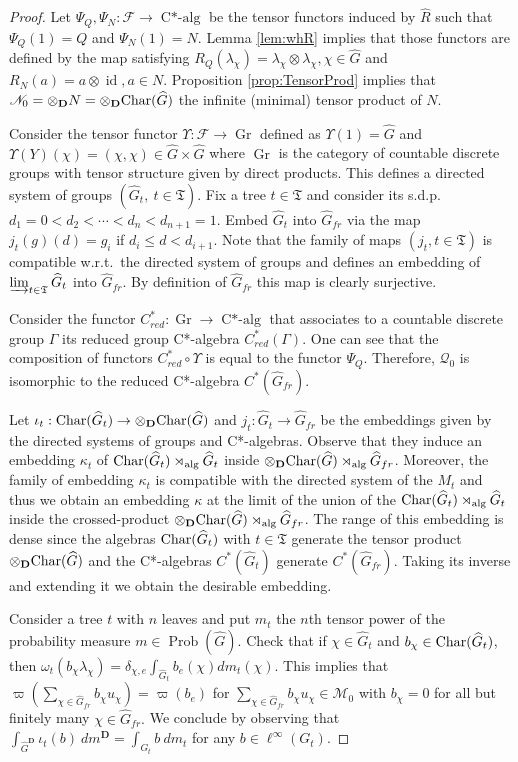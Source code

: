 \documentclass[a4paper,12pt]{amsart}
\numberwithin{equation}{section}
\theoremstyle{definition}
\DeclareMathOperator{\Gr}{Gr}
\DeclareMathOperator{\id}{id}
\DeclareMathOperator{\alg}{alg}
\DeclareMathOperator{\Calg}{C*-alg}
\newcommand{\Ch}{\textup{Char}}
\newcommand{\D}{\mathbf D}
\newcommand{\dn}{d_1=0<d_2<\cdots<d_n<d_{n+1}=1}
\newcommand{\cF}{\mathcal F}
\newcommand{\la}{\lambda}
\newcommand{\scrM}{\mathscr M}
\newcommand{\scrN}{\mathscr N}
\newcommand{\ot}{\otimes}\newcommand{\otmin}{\otimes_{\text{min}}}
\DeclareMathOperator{\Prob}{Prob}
\newcommand{\scrQ}{\mathscr Q}
\newcommand{\fT}{\mathfrak T}
\newcommand{\wh}{\widehat}
\begin{document}
\begin{proof}
Let $\Psi_Q,\Psi_N:\cF\to \Calg$ be the tensor functors induced by $\wh R$ such that $\Psi_Q(1)=Q$ and $\Psi_N(1)=N.$
Lemma \ref{lem:whR} implies that those functors are defined by the map satisfying $R_Q(\la_\chi)=\la_\chi\ot \la_\chi,\chi\in\wh G$ and $R_N(a)=a\ot \id, a\in N.$
Proposition \ref{prop:TensorProd} implies that $\scrN_0=\ot_\D N = \ot_\D \Ch(\wh G)$ the infinite (minimal) tensor product of $N$.
 
Consider the tensor functor $\Upsilon:\cF\to \Gr$ defined as $\Upsilon(1)= \wh G$ and $\Upsilon(Y)(\chi) = (\chi,\chi)\in \wh G\times \wh G$ where $\Gr$ is the category of countable discrete groups with tensor structure given by direct products.
This defines a directed system of groups $(\wh G_t,\ t\in\fT)$. 
Fix a tree $t\in\fT$ and consider its s.d.p.~$\dn$.
Embed $\wh G_t$ into $\wh G_{fr}$ via the map $j_t(g)(d) = g_i$ if $d_i\leq d < d_{i+1}.$
Note that the family of maps $(j_t, t\in\fT)$ is compatible w.r.t.~the directed system of groups and defines an embedding of $\varinjlim_{t\in\fT}\wh G_t$ into $\wh G_{fr}.$
By definition of $\wh G_{fr}$ this map is clearly surjective.

Consider the functor $C^*_{red}:\Gr\to \Calg$ that associates to a countable discrete group $\Gamma$ its reduced group C*-algebra $C^*_{red}(\Gamma).$
One can see that the composition of functors $C^*_{red}\circ \Upsilon$ is equal to the functor $\Psi_Q$.
Therefore, $\scrQ_0$ is isomorphic to the reduced C*-algebra $C^*(\wh G_{fr}).$

Let $\iota_t: \Ch(\wh G_t)\to \ot_\D \Ch(\wh G)$ and $j_t:\wh G_t\to \wh G_{fr}$ be the embeddings given by the directed systems of groups and C*-algebras.
Observe that they induce an embedding $\kappa_t$ of $\Ch(\wh G_t)\rtimes_{\alg} \wh G_t$ inside $\ot_\D \Ch(\wh G)\rtimes_{\alg} \wh G_{fr}$.
Moreover, the family of embedding $\kappa_t$ is compatible with the directed system of the $M_t$ and thus we obtain an embedding $\kappa$ at the limit of the union of the $\Ch(\wh G_t)\rtimes_{\alg} \wh G_t$ inside the crossed-product $\ot_\D \Ch(\wh G)\rtimes_{\alg} \wh G_{fr}$.
The range of this embedding is dense since the algebras $\Ch(\wh G_t)$ with $t\in\fT$ generate the tensor product $\ot_\D \Ch(\wh G)$ and the C*-algebras $C^*(\wh G_t)$ generate $C^*(\wh G_{fr}).$
Taking its inverse and extending it we obtain the desirable embedding.

Consider a tree $t$ with $n$ leaves and put $m_t$ the $n$th tensor power of the probability measure $m\in \Prob(\wh G).$
Check that if $\chi\in \wh G_t$ and $b_\chi\in  \Ch(\wh G_t)$, then $\omega_t( b_\chi \la_\chi) = \delta_{\chi,e} \int_{\wh G_t} b_e(\chi) dm_t(\chi).$
This implies that $\varpi(\sum_{\chi\in \wh G_{fr}} b_\chi u_\chi ) = \varpi(b_e)$ for $\sum_{\chi\in \wh G_{fr}} b_\chi u_\chi \in\scrM_0$ with $b_\chi=0$ for all but finitely many $\chi\in\wh G_{fr}.$
We conclude by observing that $\int_{{\wh G}^\D} \iota_t(b)\ d m^\D = \int_{G_t} b \ dm_t$ for any $b\in \ell^\infty(G_t).$


\end{proof}
\end{document}
